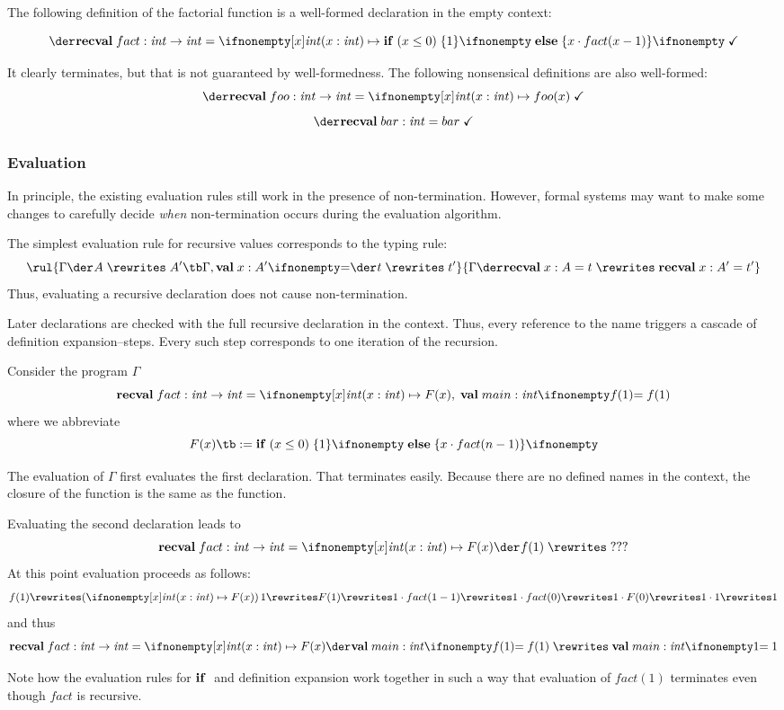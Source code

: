 \begin{example}
The following definition of the factorial function is a well-formed declaration in the empty context:

\[\isdecl{}{}{\arecval{fact}{\Int\to\Int}{\alam[\Int]{x}{\aifelseI{x\leq 0}{1}{x\cdot fact(x-1)}}}}\]

It clearly terminates, but that is not guaranteed by well-formedness.
The following nonsensical definitions are also well-formed:
\[\isdecl{}{}{\arecval{foo}{\Int\to\Int}{\alam[\Int]{x}{foo(x)}}}\]
\[\isdecl{}{}{\arecval{bar}{\Int}{bar}}\]
\end{example}

\subsubsection{Evaluation}

In principle, the existing evaluation rules still work in the presence of non-termination.
However, formal systems may want to make some changes to carefully decide \emph{when} non-termination occurs during the evaluation algorithm.

The simplest evaluation rule for recursive values corresponds to the typing rule:
\[\rul{\evobj{}{\Gamma}{A}{A'} \tb \evobj{}{\Gamma,\aval{x}{A'}{}}{t}{t'}}
      {\evdec{}{\Gamma}{\arecval{x}{A}{t}}\arecval{x}{A'}{t'}}
\]
Thus, evaluating a recursive declaration does not cause non-termination.

Later declarations are checked with the full recursive declaration in the context.
Thus, every reference to the name triggers a cascade of definition expansion--steps.
Every such step corresponds to one iteration of the recursion.

\begin{example}
Consider the program $\Gamma$
\[\arecval{fact}{\Int\to\Int}{\alam[\Int]{x}{F(x)}}, \; \aval{main}{\Int}{f(1)}\]
where we abbreviate
\[F(x) \tb := \aifelseI{x\leq 0}{1}{x\cdot fact(n-1)}\]

The evaluation of $\Gamma$ first evaluates the first declaration.
That terminates easily. Because there are no defined names in the context, the closure of the function is the same as the function.

Evaluating the second declaration leads to
\[\evobj{}{\arecval{fact}{\Int\to\Int}{\alam[\Int]{x}{F(x)}}}{f(1)}{???}\]
At this point evaluation proceeds as follows:
\[f(1) \rewrites (\alam[\Int]{x}{F(x)})\,1 \rewrites F(1) \rewrites 1\cdot fact(1-1) \rewrites 1 \cdot fact(0) \rewrites 1\cdot F(0) \rewrites 1\cdot 1\rewrites 1\]
and thus
\[\evobj{}{\arecval{fact}{\Int\to\Int}{\alam[\Int]{x}{F(x)}}}{\aval{main}{\Int}{f(1)}}{\aval{main}{\Int}{1}}\]

Note how the evaluation rules for ${\rm \bf if}\;$ and definition expansion work together in such a way that evaluation of $fact(1)$ terminates even though $fact$ is recursive.
\end{example}

